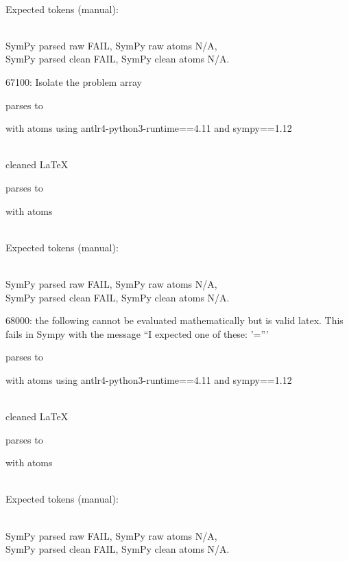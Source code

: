 \documentclass{article}
\begin{document}
\ \\
Expected tokens (manual):


\ \\
SymPy parsed raw FAIL, 
SymPy raw atoms N/A, \\
SymPy parsed clean FAIL, 
SymPy clean atoms N/A.

\hrulefill

67100:
Isolate the problem array

parses to

with atoms
using antlr4-python3-runtime==4.11 and sympy==1.12

\ \\
cleaned \LaTeX

parses to

with atoms


\ \\
Expected tokens (manual):


\ \\
SymPy parsed raw FAIL, 
SymPy raw atoms N/A, \\
SymPy parsed clean FAIL, 
SymPy clean atoms N/A.

\hrulefill

68000:
the following cannot be evaluated mathematically but is valid latex. 
This fails in Sympy with the message ``I expected one of these: '='''

parses to

with atoms
using antlr4-python3-runtime==4.11 and sympy==1.12

\ \\
cleaned \LaTeX

parses to

with atoms


\ \\
Expected tokens (manual):


\ \\
SymPy parsed raw FAIL, 
SymPy raw atoms N/A, \\
SymPy parsed clean FAIL, 
SymPy clean atoms N/A.
\end{document}

